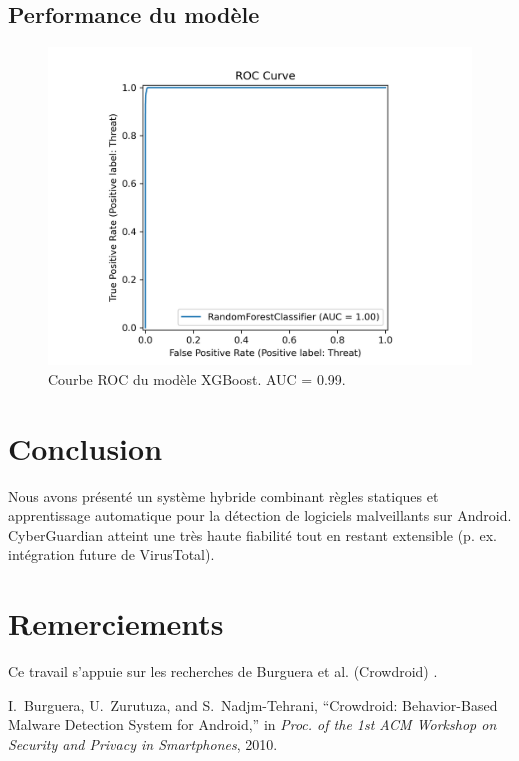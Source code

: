 \documentclass[conference]{IEEEtran}
\begin{document}
\subsection{Performance du modèle}\label{sec:perf}
\begin{figure}[h]
  \centering
  \includegraphics[width=\linewidth]{figures/roc_curve.png}
  \caption{Courbe ROC du modèle XGBoost. AUC = 0.99.}\label{fig:roc}
\end{figure}

\section{Conclusion}
Nous avons présenté un système hybride combinant règles statiques et apprentissage
automatique pour la détection de logiciels malveillants sur Android.
CyberGuardian atteint une très haute fiabilité tout en restant extensible
(p. ex. intégration future de VirusTotal).  

\section*{Remerciements}
Ce travail s’appuie sur les recherches de Burguera et al. (Crowdroid) \cite{Burguera2010Crowdroid}.


\begin{thebibliography}{1}
I.~Burguera, U.~Zurutuza, and S.~Nadjm-Tehrani, ``Crowdroid: Behavior-Based Malware Detection System for Android,'' in \emph{Proc. of the 1st ACM Workshop on Security and Privacy in Smartphones}, 2010.
\end{thebibliography}
\end{document}
